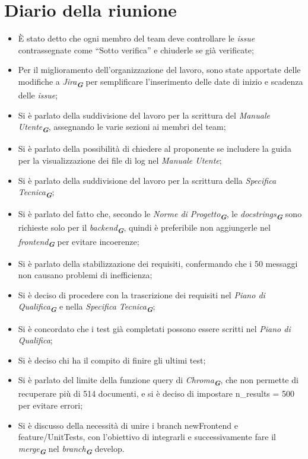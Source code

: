 
\section{Diario della riunione}

\begin{itemize}
    \item È stato detto che ogni membro del team deve controllare le \emph{issue} contrassegnate come “Sotto verifica” e chiuderle se già verificate;
    \item Per il miglioramento dell'organizzazione del lavoro, sono state apportate delle modifiche a \emph{Jira}\textsubscript{\textit{\textbf{G}}} per semplificare l’inserimento delle date di inizio e scadenza delle \emph{issue};
    \item Si è parlato della suddivisione del lavoro per la scrittura del \emph{Manuale Utente}\textsubscript{\textit{\textbf{G}}}, assegnando le varie sezioni ai membri del team;
    \item Si è parlato della possibilità di chiedere al proponente se includere la guida per la visualizzazione dei file di log nel \emph{Manuale Utente};
    \item Si è parlato della suddivisione del lavoro per la scrittura della \emph{Specifica Tecnica}\textsubscript{\textit{\textbf{G}}};
    \item Si è parlato del fatto che, secondo le \emph{Norme di Progetto}\textsubscript{\textit{\textbf{G}}}, le \emph{docstrings}\textsubscript{\textit{\textbf{G}}} sono richieste solo per il \emph{backend}\textsubscript{\textit{\textbf{G}}}, quindi è preferibile non aggiungerle nel \emph{frontend}\textsubscript{\textit{\textbf{G}}} per evitare incoerenze;
    \item Si è parlato della stabilizzazione dei requisiti, confermando che i 50 messaggi non causano problemi di inefficienza;
    \item Si è deciso di procedere con la trascrizione dei requisiti nel \emph{Piano di Qualifica}\textsubscript{\textit{\textbf{G}}} e nella \emph{Specifica Tecnica}\textsubscript{\textit{\textbf{G}}};
    \item Si è concordato che i test già completati possono essere scritti nel \emph{Piano di Qualifica};
    \item Si è deciso chi ha il compito di finire gli ultimi test;
    \item Si è parlato del limite della funzione query di \emph{Chroma}\textsubscript{\textit{\textbf{G}}}, che non permette di recuperare più di 514 documenti, e si è deciso di impostare n\_results = 500 per evitare errori;
    \item Si è discusso della necessità di unire i branch newFrontend e feature/UnitTests, con l’obiettivo di integrarli e successivamente fare il \emph{merge}\textsubscript{\textit{\textbf{G}}} nel \emph{branch}\textsubscript{\textit{\textbf{G}}} develop.
\end{itemize}


